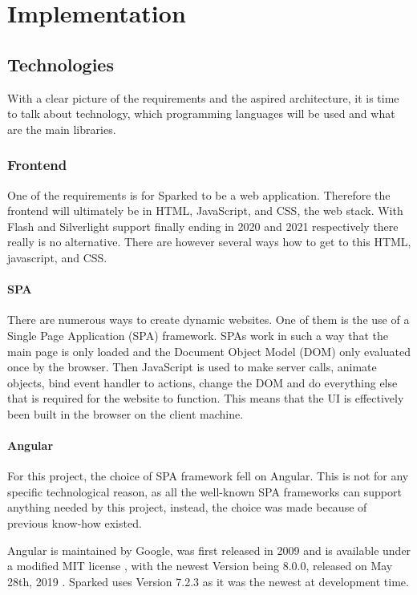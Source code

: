 \chapter{Implementation}

\section{Technologies}
With a clear picture of the requirements and the aspired architecture, it is time to talk about technology, which programming languages will be used and what are the main libraries.

\subsection{Frontend}
One of the requirements is for Sparked to be a web application. Therefore the frontend will ultimately be in HTML, JavaScript, and CSS, the web stack. With Flash and Silverlight support finally ending in 2020 and 2021 respectively \cite{silverlight} \cite{flash} there really is no alternative. There are however several ways how to get to this HTML, javascript, and CSS.

\subsubsection{SPA}
There are numerous ways to create dynamic websites. One of them is the use of a Single Page Application (SPA) framework. SPAs work in such a way that the main page is only loaded and the Document Object Model (DOM) only evaluated once by the browser. Then JavaScript is used to make server calls, animate objects, bind event handler to actions, change the DOM and do everything else that is required for the website to function. This means that the UI is effectively been built in the browser on the client machine.

\subsubsection{Angular}
For this project, the choice of SPA framework fell on Angular. This is not for any specific technological reason, as all the well-known SPA frameworks can support anything needed by this project, instead, the choice was made because of previous know-how existed. 

Angular is maintained by Google, was first released in 2009 \cite{angularJS} and is available under a modified MIT license \cite{angular}, with the newest Version being 8.0.0, released on May 28th, 2019 \cite{angularRelease}. Sparked uses Version 7.2.3 as it was the newest at development time. 

